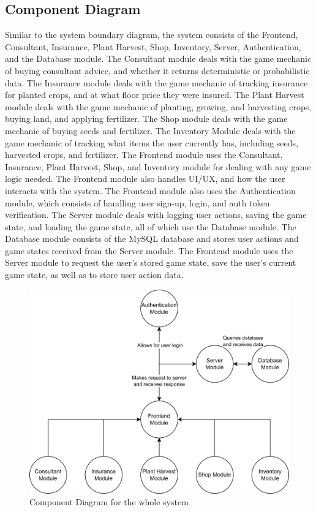 \documentclass[12pt, titlepage]{article}
\begin{document}
 

\subsection{Component Diagram} Similar to the system boundary diagram, the system consists of the Frontend, Consultant, Insurance, Plant Harvest, Shop, Inventory, Server, Authentication, and the Database module. The Consultant module deals with the game mechanic of buying consultant advice, and whether it returns deterministic or probabilistic data. The Insurance module deals with the game mechanic of tracking insurance for planted crops, and at what floor price they were insured. The Plant Harvest module deals with the game mechanic of planting, growing, and harvesting crops, buying land, and applying fertilizer. The Shop module deals with the game mechanic of buying seeds and fertilizer. The Inventory Module deals with the game mechanic of tracking what items the user currently has, including seeds, harvested crops, and fertilizer. The Frontend module uses the Consultant, Insurance, Plant Harvest, Shop, and Inventory module for dealing with any game logic needed. The Frontend module also handles UI/UX, and how the user interacts with the system. The Frontend module also uses the Authentication module, which consists of handling user sign-up, login, and auth token verification. The Server module deals with logging user actions, saving the game state, and loading the game state, all of which use the Database module. The Database module consists of the MySQL database and stores user actions and game states received from the Server module. The Frontend module uses the Server module to request the user's stored game state, save the user's current game state, as well as to store user action data.

\begin{figure}[H]
\centering
\includegraphics[width=1\textwidth]{systdec.drawio.png}
\caption{Component Diagram for the whole system}
\label{FigUH}
\end{figure}
\end{document}
